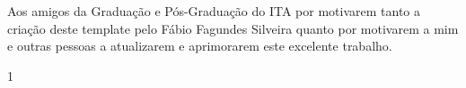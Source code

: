 \maketitle

\begin{itadedication}
Aos amigos da Graduação e Pós-Graduação do ITA por motivarem tanto a criação deste template pelo Fábio Fagundes Silveira quanto por motivarem a mim e outras pessoas a atualizarem e aprimorarem este excelente trabalho.
\end{itadedication}

\begin{itathanks}

\end{itathanks}

\ifhyperref{}\fi
\begin{flushright}
\begin{spacing}{1}
\mbox{}\vfill

\end{spacing}
\end{flushright}

\begin{abstract}
\noindent

\end{abstract}

\begin{englishabstract}
\noindent

\end{englishabstract}

\listoffigures %

\listoftables %

\listofabbreviations
    
\listofsymbols

\tableofcontents
